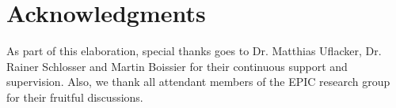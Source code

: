 \documentclass{sig-alternate-05-2015}
\begin{document}


\section{Acknowledgments}
As part of this elaboration, special thanks goes to Dr. Matthias Uflacker, Dr. Rainer Schlosser and Martin Boissier for their continuous support and supervision. Also, we thank all attendant members of the EPIC research group for their fruitful discussions.



  
\end{document}
